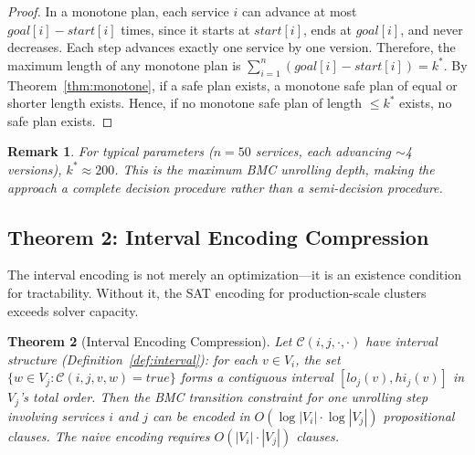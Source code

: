 \documentclass[10pt,twocolumn]{article}
\newtheorem{theorem}{Theorem}[section]
\newtheorem{remark}[theorem]{Remark}
\begin{document}
\begin{proof}
In a monotone plan, each service $i$ can advance at most $\mathit{goal}[i] - \mathit{start}[i]$ times, since it starts at $\mathit{start}[i]$, ends at $\mathit{goal}[i]$, and never decreases. Each step advances exactly one service by one version. Therefore, the maximum length of any monotone plan is $\sum_{i=1}^n (\mathit{goal}[i] - \mathit{start}[i]) = k^*$. By Theorem~\ref{thm:monotone}, if a safe plan exists, a monotone safe plan of equal or shorter length exists. Hence, if no monotone safe plan of length $\leq k^*$ exists, no safe plan exists.
\end{proof}

\begin{remark}
For typical parameters ($n = 50$ services, each advancing $\sim$4 versions), $k^* \approx 200$. This is the maximum BMC unrolling depth, making the approach a \emph{complete} decision procedure rather than a semi-decision procedure.
\end{remark}

\subsection{Theorem 2: Interval Encoding Compression}
\label{sec:interval-encoding}

The interval encoding is not merely an optimization---it is an existence condition for tractability. Without it, the SAT encoding for production-scale clusters exceeds solver capacity.

\begin{theorem}[Interval Encoding Compression]
\label{thm:interval}
Let $\mathcal{C}(i,j,\cdot,\cdot)$ have interval structure (Definition~\ref{def:interval}): for each $v \in V_i$, the set $\{w \in V_j : \mathcal{C}(i,j,v,w) = \mathit{true}\}$ forms a contiguous interval $[\mathit{lo}_j(v), \mathit{hi}_j(v)]$ in $V_j$'s total order. Then the BMC transition constraint for one unrolling step involving services $i$ and $j$ can be encoded in $O(\log|V_i| \cdot \log|V_j|)$ propositional clauses. The naive encoding requires $O(|V_i| \cdot |V_j|)$ clauses.
\end{theorem}
\end{document}
